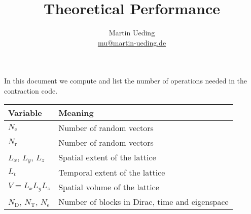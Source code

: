 \documentclass[
    11pt,
    english,
    fleqn,
    DIV=15,
    headinclude,
]{scrartcl}
\title{Theoretical Performance}
\author{
    Martin Ueding \\ \small{\href{mailto:mu@martin-ueding.de}{mu@martin-ueding.de}}
}
\begin{document}
\maketitle

In this document we compute and list the number of operations needed in the
contraction code.

\newcommand\Ne{N_\text{e}}
\newcommand\Nr{N_\text{r}}
\newcommand\bD{N_\text{D}}
\newcommand\bT{N_\text{T}}
\newcommand\be{N_\text{e}}

\begin{tabular}{ll}
    \toprule
    Variable & Meaning \\
    \midrule
    $\Ne$ & Number of random vectors \\
    $\Nr$ & Number of random vectors \\
    $L_x$, $L_y$, $L_z$ & Spatial extent of the lattice \\
    $L_t$ & Temporal extent of the lattice \\
    $V = L_x L_y L_z$ & Spatial volume of the lattice \\
    $\bD$, $\bT$, $\be$ & Number of blocks in Dirac, time and eigenspace \\
    \bottomrule
\end{tabular}


\end{document}
